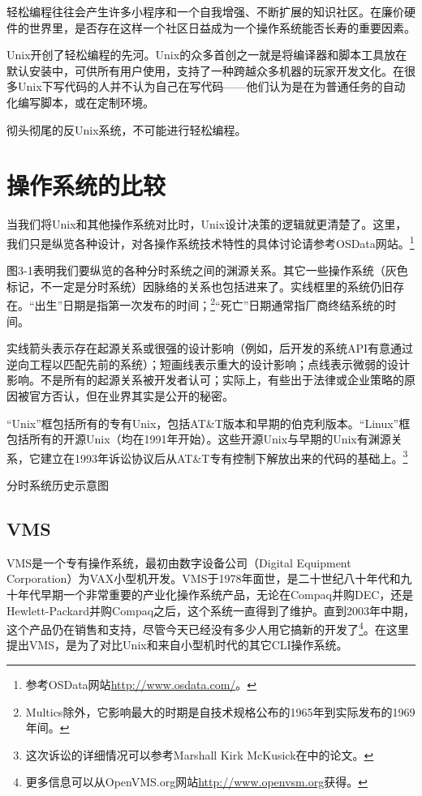 \documentclass[12pt,oneside]{book}
\begin{document}
\begin{common-format}
轻松编程往往会产生许多小程序和一个自我增强、不断扩展的知识社区。在廉价硬件的世界里，是否存在这样一个社区日益成为一个操作系统能否长寿的重要因素。

Unix开创了轻松编程的先河。Unix的众多首创之一就是将编译器和脚本工具放在默认安装中，可供所有用户使用，支持了一种跨越众多机器的玩家开发文化。在很多Unix下写代码的人并不认为自己在写代码——他们认为是在为普通任务的自动化编写脚本，或在定制环境。

彻头彻尾的反Unix系统，不可能进行轻松编程。

\section{操作系统的比较}
当我们将Unix和其他操作系统对比时，Unix设计决策的逻辑就更清楚了。这里，我们只是纵览各种设计，对各操作系统技术特性的具体讨论请参考OSData网站。\footnote{参考OSData网站\href{http://www.osdata.com/}{http://www.osdata.com/}。}

图3-1表明我们要纵览的各种分时系统之间的渊源关系。其它一些操作系统（灰色标记，不一定是分时系统）因脉络的关系也包括进来了。实线框里的系统仍旧存在。“出生”日期是指第一次发布的时间；\footnote{Multics除外，它影响最大的时期是自技术规格公布的1965年到实际发布的1969年间。}“死亡”日期通常指厂商终结系统的时间。

实线箭头表示存在起源关系或很强的设计影响（例如，后开发的系统API有意通过逆向工程以匹配先前的系统）；短画线表示重大的设计影响；点线表示微弱的设计影响。不是所有的起源关系被开发者认可；实际上，有些出于法律或企业策略的原因被官方否认，但在业界其实是公开的秘密。

“Unix”框包括所有的专有Unix，包括AT\&{}T版本和早期的伯克利版本。“Linux”框包括所有的开源Unix（均在1991年开始）。这些开源Unix与早期的Unix有渊源关系，它建立在1993年诉讼协议后从AT\&{}T专有控制下解放出来的代码的基础上。\footnote{这次诉讼的详细情况可以参考Marshall Kirk McKusick在\cite{OpenSources}中的论文。}

\begin{linefig}{分时系统历史示意图}
\label{fig:分时系统历史示意图}
\end{linefig}

\subsection{VMS}
VMS是一个专有操作系统，最初由数字设备公司（Digital Equipment Corporation）为VAX小型机开发。VMS于1978年面世，是二十世纪八十年代和九十年代早期一个非常重要的产业化操作系统产品，无论在Compaq并购DEC，还是Hewlett-Packard并购Compaq之后，这个系统一直得到了维护。直到2003年中期，这个产品仍在销售和支持，尽管今天已经没有多少人用它搞新的开发了\footnote{更多信息可以从OpenVMS.org网站\href{http://www.openvsm.org}{http://www.openvsm.org}获得。}。在这里提出VMS，是为了对比Unix和来自小型机时代的其它CLI操作系统。


\end{common-format}
\end{document}
